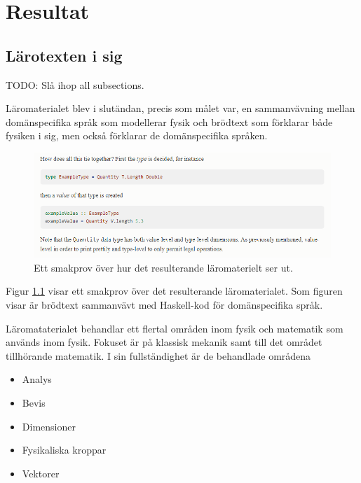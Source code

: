 
\chapter{Resultat}

\begin{binge}

\section{Lärotexten i sig}

TODO: Slå ihop all subsections.

Läromaterialet blev i slutändan, precis som målet var, en sammanvävning mellan
domänspecifika språk som modellerar fysik och brödtext som förklarar både
fysiken i sig, men också förklarar de domänspecifika språken.

\begin{figure}
  \includegraphics[width=\linewidth]{figure/smakprov_laromaterial.png}
  \caption{Ett smakprov över hur det resulterande läromaterielt ser ut.}
  \label{fig:smakprov_laromaterial}
\end{figure}

Figur \ref{fig:smakprov_laromaterial} visar ett smakprov över det resulterande
läromaterialet. Som figuren visar är brödtext sammanvävt med Haskell-kod för
domänspecifika språk.

Läromataterialet behandlar ett flertal områden inom fysik och matematik som
används inom fysik. Fokuset är på klassisk mekanik samt till det området tillhörande
matematik. I sin fullständighet är de behandlade områdena

\begin{itemize}
  \item Analys
  \item Bevis
  \item Dimensioner
  \item Fysikaliska kroppar
  \item Vektorer
\end{itemize}


\end{binge}
